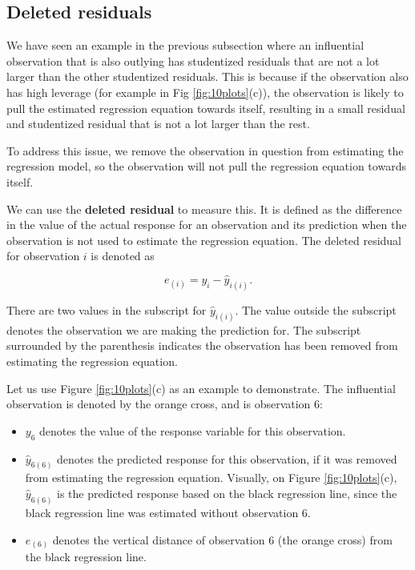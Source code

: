 \documentclass[
]{book}
\providecommand{\tightlist}{%
  \setlength{\itemsep}{0pt}\setlength{\parskip}{0pt}}
\begin{document}
\hypertarget{deleted-residuals}{%
\subsection{Deleted residuals}\label{deleted-residuals}}

We have seen an example in the previous subsection where an influential observation that is also outlying has studentized residuals that are not a lot larger than the other studentized residuals. This is because if the observation also has high leverage (for example in Fig \ref{fig:10plots}(c)), the observation is likely to pull the estimated regression equation towards itself, resulting in a small residual and studentized residual that is not a lot larger than the rest.

To address this issue, we remove the observation in question from estimating the regression model, so the observation will not pull the regression equation towards itself.

We can use the \textbf{deleted residual} to measure this. It is defined as the difference in the value of the actual response for an observation and its prediction when the observation is not used to estimate the regression equation. The deleted residual for observation \(i\) is denoted as

\begin{equation} 
e_{(i)}=y_i-\hat{y}_{i(i)}.
\label{eq:10deleted}
\end{equation}

There are two values in the subscript for \(\hat{y}_{i(i)}\). The value outside the subscript denotes the observation we are making the prediction for. The subscript surrounded by the parenthesis indicates the observation has been removed from estimating the regression equation.

Let us use Figure \ref{fig:10plots}(c) as an example to demonstrate. The influential observation is denoted by the orange cross, and is observation 6:

\begin{itemize}
\tightlist
\item
  \(y_6\) denotes the value of the response variable for this observation.
\item
  \(\hat{y}_{6(6)}\) denotes the predicted response for this observation, if it was removed from estimating the regression equation. Visually, on Figure \ref{fig:10plots}(c), \(\hat{y}_{6(6)}\) is the predicted response based on the black regression line, since the black regression line was estimated without observation 6.
\item
  \(e_{(6)}\) denotes the vertical distance of observation 6 (the orange cross) from the black regression line.
\end{itemize}
\end{document}
